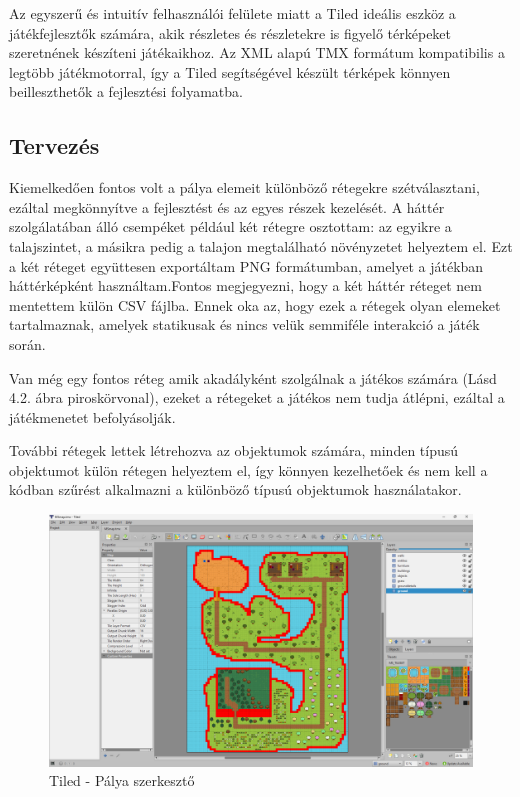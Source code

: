 Az egyszerű és intuitív felhasználói felülete miatt a Tiled ideális eszköz a játékfejlesztők számára, akik részletes és részletekre is figyelő térképeket szeretnének készíteni játékaikhoz. Az XML alapú TMX formátum kompatibilis a legtöbb játékmotorral, így a Tiled segítségével készült térképek könnyen beilleszthetők a fejlesztési folyamatba.


\subsection{Tervezés}

\indent \indent Kiemelkedően fontos volt a pálya elemeit különböző rétegekre szétválasztani, ezáltal megkönnyítve a fejlesztést és az egyes részek kezelését. A háttér szolgálatában álló csempéket például két rétegre osztottam: az egyikre a talajszintet, a másikra pedig a talajon megtalálható növényzetet helyeztem el. Ezt a két réteget együttesen exportáltam PNG formátumban, amelyet a játékban háttérképként használtam.Fontos megjegyezni, hogy a két háttér réteget nem mentettem külön CSV fájlba. Ennek oka az, hogy ezek a rétegek olyan elemeket tartalmaznak, amelyek statikusak és nincs velük semmiféle interakció a játék során. 

Van még egy fontos réteg amik akadályként szolgálnak a játékos számára (Lásd 4.2. ábra piroskörvonal), ezeket a rétegeket a játékos nem tudja átlépni, ezáltal a játékmenetet befolyásolják.  

További rétegek lettek létrehozva az objektumok számára, minden típusú objektumot külön rétegen helyeztem el, így könnyen kezelhetőek és nem kell a kódban szűrést alkalmazni a különböző típusú objektumok használatakor.

\begin{figure}[H]
    \centering
    \includegraphics[width=14.0truecm]{images/Tiled.png}
    \caption{Tiled - Pálya szerkesztő
    \cite{Tiled}}
    \label{fig:Tiled}
\end{figure}

